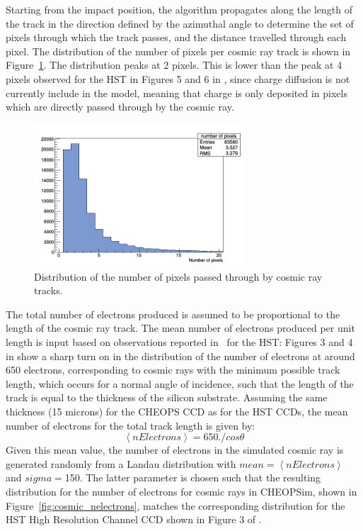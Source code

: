 \documentclass[11pt]{article}      %
\begin{document}
Starting from the impact position, the algorithm propagates along the length of the track in the direction defined by the azimuthal angle to determine the set of pixels through which the track passes, and the distance travelled through each pixel. The distribution of the number of pixels per cosmic ray track is shown in Figure~\ref{fig:cosmic_npixels}. The distribution peaks at 2 pixels.  This is lower than the peak at 4 pixels observed for the HST in Figures 5 and 6 in \cite{HST_ISR0207}, since charge diffusion is not currently include in the model, meaning that charge is only deposited in pixels which are directly passed through by the cosmic ray.

\begin{figure}[hbtp]
  \begin{center}
    \includegraphics[width=0.7\textwidth]{cosmic_nPixels.png}
    \caption{Distribution of the number of pixels passed through by cosmic ray tracks.}
    \label{fig:cosmic_npixels}
  \end{center}
\end{figure}

The total number of electrons produced is assumed to be proportional to the length of the cosmic ray track.  The mean number of electrons produced per unit length is input based on observations reported in~\cite{HST_ISR0207} for the HST: Figures 3 and 4 in \cite{HST_ISR0207} show a sharp turn on in the distribution of the number of electrons at around 650 electrons, corresponding to cosmic rays with the minimum possible track length, which occurs for a normal angle of incidence, such that the length of the track is equal to the thickness of the silicon substrate.  Assuming the same thickness (15 microns) for the CHEOPS CCD as for the HST CCDs, the mean number of electrons for the total track length is given by:
$$\left< nElectrons\right> = 650. / cos\theta$$
Given this mean value, the number of electrons in the simulated cosmic ray is generated randomly from a Landau distribution with $mean=\left< nElectrons\right>$ and $sigma=$150.  The latter parameter is chosen such that the resulting distribution for the number of electrons for cosmic rays in CHEOPSim, shown in Figure~\ref{fig:cosmic_nelectrons}, matches the corresponding distribution for the HST High Resolution Channel CCD shown in Figure 3 of \cite{HST_ISR0207}.
\end{document}

